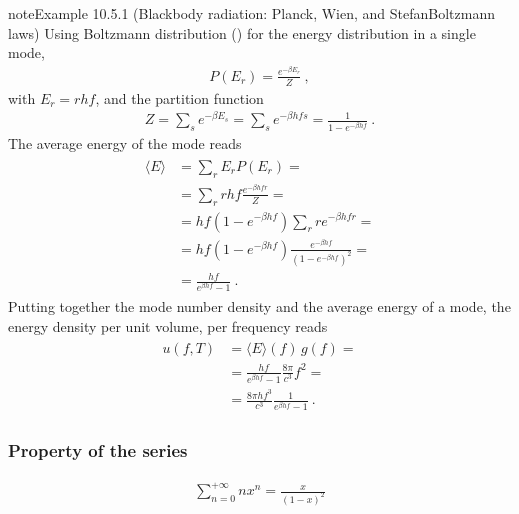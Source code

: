 \documentclass[letterpaper,10pt,english]{jupyterBook}
\begin{document}
\begin{sphinxadmonition}{note}{Example 10.5.1 (Black\sphinxhyphen{}body radiation: Planck, Wien, and Stefan\sphinxhyphen{}Boltzmann laws)}
\sphinxAtStartPar
Using Boltzmann distribution () for the energy distribution in a single mode,
\begin{equation*}
\begin{split}P(E_r) = \frac{e^{-\beta E_r}}{Z} \ ,\end{split}
\end{equation*}
\sphinxAtStartPar
with \(E_r = r h f\), and the partition function
\begin{equation*}
\begin{split}Z = \sum_{s} e^{- \beta E_s} = \sum_s e^{-\beta h f s} = \frac{1}{1 - e^{-\beta h f}} \ .\end{split}
\end{equation*}
\sphinxAtStartPar
The average energy of the mode reads
\begin{equation*}
\begin{split}\begin{aligned}
  \langle E \rangle
  & = \sum_r E_r P(E_r) = \\
  & = \sum_r r h f \frac{e^{- \beta h f r}}{Z} = \\
  & = h f (1-e^{-\beta h f}) \sum_r r e^{- \beta h f r} = \\
  & = h f (1-e^{-\beta h f}) \frac{e^{- \beta h f}}{(1-e^{-\beta h f})^2} = \\
  & = \frac{h f}{e^{\beta h f} - 1}  \ .
\end{aligned}\end{split}
\end{equation*}
\sphinxAtStartPar
Putting together the mode number density and the average energy of a mode, the energy density per unit volume, per frequency reads
\begin{equation*}
\begin{split}\begin{aligned}
  u(f, T)
  & = \langle E \rangle(f) \, g(f) = \\
  & = \frac{hf}{e^{\beta h f} - 1} \frac{8 \pi}{c^3} f^2 = \\
  & = \frac{8 \pi h f^3}{c^3} \frac{1}{e^{\beta h f} - 1} \ .
\end{aligned}\end{split}
\end{equation*}\subsubsection*{Property of the series}
\begin{equation*}
\begin{split}\sum_{n=0}^{+\infty} n x^n = \frac{x}{(1-x)^2}\end{split}

\end{equation*}
\end{sphinxadmonition}
\end{document}
